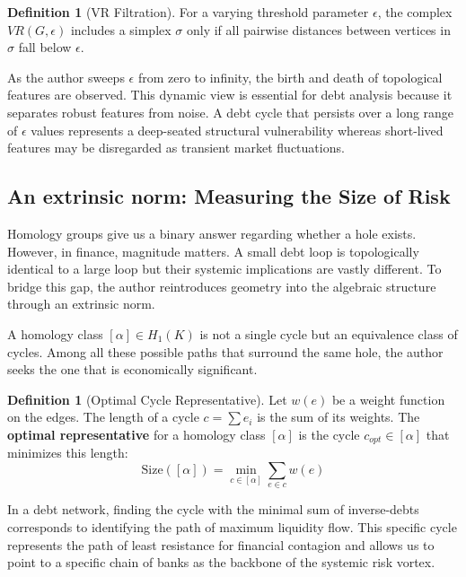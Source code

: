\documentclass[12pt,reqno]{amsart}
\theoremstyle{definition}
\newtheorem{definition}[theorem]{Definition}
\numberwithin{equation}{section}
\begin{document}
   \begin{definition}[VR Filtration]
   For a varying threshold parameter $\epsilon$, the complex $VR(G, \epsilon)$ includes a simplex $\sigma$ only if all pairwise distances between vertices in $\sigma$ fall below $\epsilon$.
   \end{definition}

   As the author sweeps $\epsilon$ from zero to infinity, the birth and death of topological features are observed. This dynamic view is essential for debt analysis because it separates robust features from noise. A debt cycle that persists over a long range of $\epsilon$ values represents a deep-seated structural vulnerability whereas short-lived features may be disregarded as transient market fluctuations.

   \subsection{An extrinsic norm: Measuring the Size of Risk}\label{sec:extrinsic} 
   Homology groups give us a binary answer regarding whether a hole exists. However, in finance, magnitude matters. A small debt loop is topologically identical to a large loop but their systemic implications are vastly different. To bridge this gap, the author reintroduces geometry into the algebraic structure through an extrinsic norm.

   A homology class $[\alpha] \in H_1(K)$ is not a single cycle but an equivalence class of cycles. Among all these possible paths that surround the same hole, the author seeks the one that is economically significant.

   \begin{definition}[Optimal Cycle Representative]
   Let $w(e)$ be a weight function on the edges. The length of a cycle $c = \sum e_i$ is the sum of its weights. The \textbf{optimal representative} for a homology class $[\alpha]$ is the cycle $c_{opt} \in [\alpha]$ that minimizes this length:
   \begin{equation}
       \text{Size}([\alpha]) = \min_{c \in [\alpha]} \sum_{e \in c} w(e)
   \end{equation}
   \end{definition}

   In a debt network, finding the cycle with the minimal sum of inverse-debts corresponds to identifying the path of maximum liquidity flow. This specific cycle represents the path of least resistance for financial contagion and allows us to point to a specific chain of banks as the backbone of the systemic risk vortex.
\end{document}
